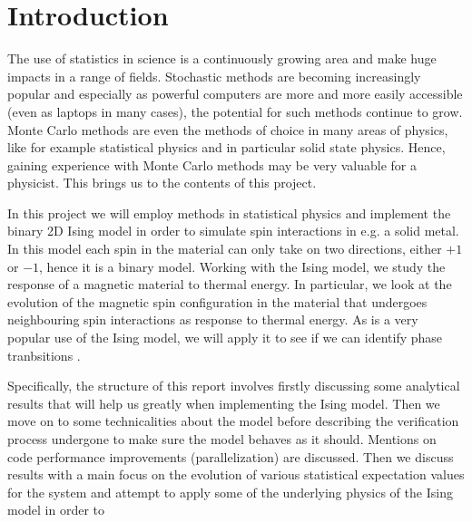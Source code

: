 \documentclass[12pt]{article}
\numberwithin{figure}{section}
\numberwithin{table}{section}
\begin{document}
\section{Introduction} \label{sec:intro}
The use of statistics in science is a continuously growing area and make huge impacts in a range of fields. Stochastic methods are becoming increasingly popular and especially as powerful computers are more and more easily accessible (even as laptops in many cases), the potential for such methods continue to grow. Monte Carlo methods are even the methods of choice in many areas of physics, like for example statistical physics and in particular solid state physics. Hence, gaining experience with Monte Carlo methods may be very valuable for a physicist. This brings us to the contents of this project.
\vspace{0.30cm}

\noindent In this project we will employ methods in statistical physics and implement the binary 2D Ising model in order to simulate spin interactions in e.g. a solid metal. In this model each spin in the material can only take on two directions, either $+1$ or $-1$, hence it is a binary model. Working with the Ising model, we study the response of a magnetic material to thermal energy. In particular, we look at the evolution of the magnetic spin configuration in the material that undergoes neighbouring spin interactions as response to thermal energy. As is a very popular use of the Ising model, we will apply it to see if we can identify phase tranbsitions \cite{Comp}.
\vspace{0.30cm}

\noindent Specifically, the structure of this report involves firstly discussing some analytical results that will help us greatly when implementing the Ising model. Then we move on to some technicalities about the model before describing the verification process undergone to make sure the model behaves as it should. Mentions on code performance improvements (parallelization) are discussed. Then we discuss results with a main focus on the evolution of various statistical expectation values for the system and attempt to apply some of the underlying physics of the Ising model in order to 


\end{document}
